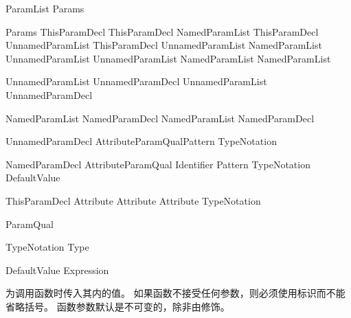 \begin{bnf}{ParamList}
    Params \terminal{,}\bnfq
\end{bnf}

\begin{bnf}{Params}
    ThisParamDecl \br
    ThisParamDecl \terminal{,} NamedParamList \br
    ThisParamDecl \terminal{,} UnnamedParamList \br
    ThisParamDecl \terminal{,} UnnamedParamList \terminal{,} NamedParamList \br
    UnnamedParamList \br
    UnnamedParamList \terminal{,} NamedParamList \br
    NamedParamList
\end{bnf}

\begin{bnf}{UnnamedParamList}
    UnnamedParamDecl \br
    UnnamedParamList \terminal{,} UnnamedParamDecl
\end{bnf}

\begin{bnf}{NamedParamList}
    NamedParamDecl \br
    NamedParamList \terminal{,} NamedParamDecl
\end{bnf}

\begin{bnf}{UnnamedParamDecl}
    Attribute\bnfs ParamQual\bnfq Pattern TypeNotation
\end{bnf}

\begin{bnf}{NamedParamDecl}
    Attribute\bnfs ParamQual\bnfs \terminal{(} Identifier \terminal{)} Pattern TypeNotation DefaultValue\bnfq
\end{bnf}

\begin{bnf}{ThisParamDecl}
    Attribute\bnfs {}\bnfq {} \br
    Attribute\bnfs \terminal{\&} \bnfq {} \br
    Attribute\bnfs {} TypeNotation
\end{bnf}

\begin{bnf}{ParamQual}
     \br
     \br
     \br
\end{bnf}

\begin{bnf}{TypeNotation}
    \terminal{:} Type
\end{bnf}

\begin{bnf}{DefaultValue}
    \terminal{=} Expression
\end{bnf}

\pnum
{}为调用函数时传入其内的值。
如果函数不接受任何参数，则必须使用\tcode{()}标识而不能省略括号。
函数参数默认是不可变的，除非由修饰。

